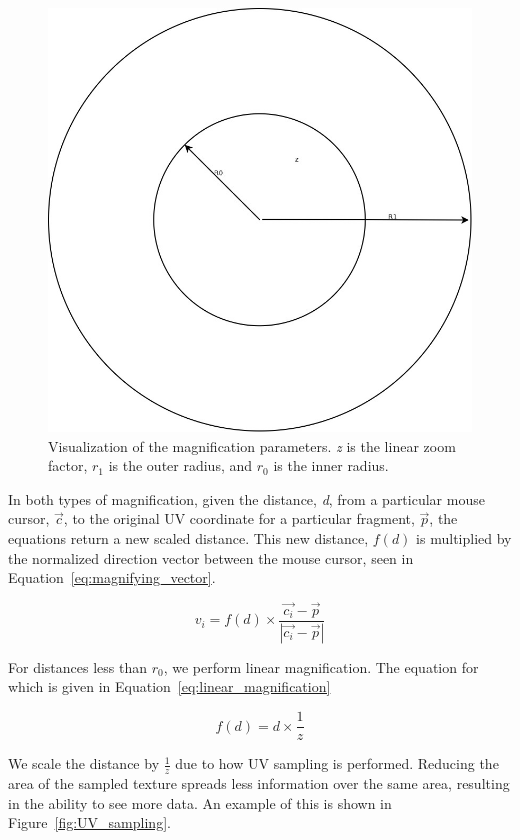 \begin{figure}[htp] \centering
    \includegraphics[width=0.4\linewidth]{img/cursor_mag.jpg}
    \caption[Magnification Parameters]{Visualization of the magnification parameters. \emph{z} is the linear zoom factor, \emph{$r_1$} is the outer radius, and \emph{$r_0$} is the inner radius.}
    \label{fig:mag_parameters}
\end{figure}

In both types of magnification, given the distance, \emph{d}, from a particular mouse cursor, $\vec{c}$,  to the 
original UV coordinate for a particular fragment, $\vec{p}$, the equations return a new scaled distance. This new 
distance, $f(d)$ is multiplied by the normalized direction vector between the mouse cursor, seen in
Equation~\ref{eq:magnifying_vector}.

\begin{equation}
    \label{eq:magnifying_vector} 
    v_i = f(d) \times \frac{\vec{c_i} - \vec{p}}{|\vec{c_i} - \vec{p}|}
\end{equation}

For distances less than \emph{$r_0$}, we perform linear magnification. The equation for which is given in 
Equation~\ref{eq:linear_magnification}

\begin{equation}
    \label{eq:linear_magnification}
    f(d) = d \times \frac{1}{z}
\end{equation}

We scale the distance by $\frac{1}{z}$ due to how UV sampling is performed. Reducing the area of the sampled 
texture spreads less information over the same area, resulting in the ability to see more data. An example of this is shown in Figure~\ref{fig:UV_sampling}.

